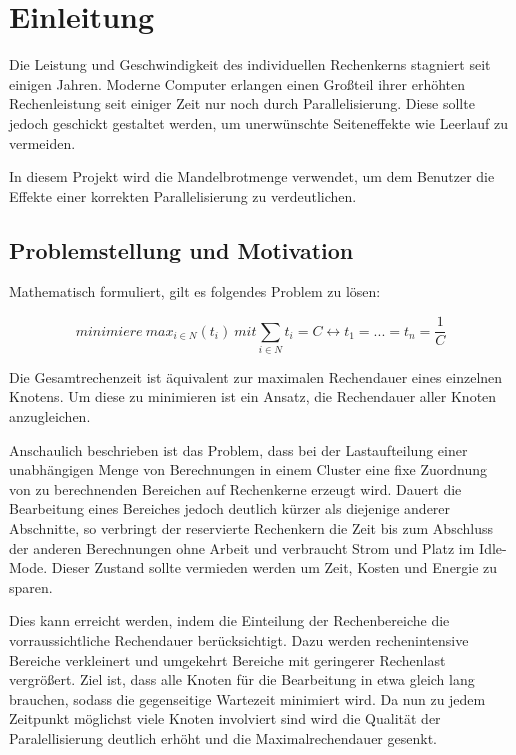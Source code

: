 \section{Einleitung}

Die Leistung und Geschwindigkeit des individuellen Rechenkerns stagniert seit einigen Jahren.
Moderne Computer erlangen einen Großteil ihrer erhöhten Rechenleistung
seit einiger Zeit nur noch durch Parallelisierung.
Diese sollte jedoch geschickt gestaltet werden, um unerwünschte Seiteneffekte
wie Leerlauf zu vermeiden.

In diesem Projekt wird die Mandelbrotmenge verwendet, um dem Benutzer die Effekte einer korrekten Parallelisierung zu verdeutlichen.

\subsection{Problemstellung und Motivation}

Mathematisch formuliert, gilt es folgendes Problem zu lösen:

\begin{equation}
minimiere\ {max_{i \in N}(t_i)}\ mit \sum_{i \in N} {t_i} = C \leftrightarrow t_1 = ... = t_n = \frac{1}{C}
\end{equation}

Die Gesamtrechenzeit ist äquivalent zur maximalen Rechendauer eines einzelnen Knotens.
Um diese zu minimieren ist ein Ansatz, die Rechendauer aller Knoten anzugleichen.

Anschaulich beschrieben ist das Problem, dass bei der Lastaufteilung einer unabhängigen Menge
von Berechnungen in einem Cluster eine fixe Zuordnung von
zu berechnenden Bereichen auf Rechenkerne erzeugt wird. Dauert die Bearbeitung eines Bereiches jedoch deutlich kürzer
als diejenige anderer Abschnitte, so verbringt der reservierte Rechenkern die Zeit bis zum Abschluss der anderen Berechnungen
ohne Arbeit und verbraucht Strom und Platz im Idle-Mode.
Dieser Zustand sollte vermieden werden um Zeit, Kosten und Energie zu sparen.

Dies kann erreicht werden, indem die Einteilung der Rechenbereiche die vorraussichtliche Rechendauer berücksichtigt.
Dazu werden rechenintensive Bereiche verkleinert und umgekehrt Bereiche mit geringerer Rechenlast vergrößert.
Ziel ist, dass alle Knoten für die Bearbeitung in etwa gleich lang brauchen,
sodass die gegenseitige Wartezeit minimiert wird.
Da nun zu jedem Zeitpunkt möglichst viele Knoten involviert sind wird die Qualität der Paralellisierung deutlich erhöht
und die Maximalrechendauer gesenkt.

